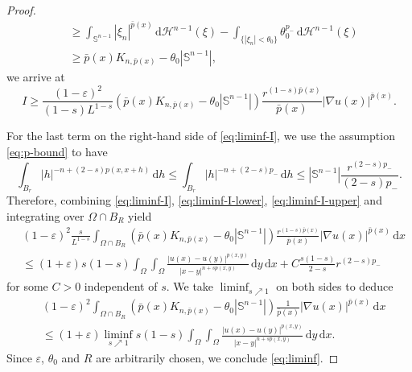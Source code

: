 \documentclass[10pt,a4paper]{amsart}
\begin{document}
\begin{proof}
\begin{equation*}
\begin{split}
&\geq \int_{\mathbb{S}^{n-1}} |\xi_{n}|^{\bar{p}(x)} \,\mathrm{d}\mathcal{H}^{n-1}(\xi) - \int_{\lbrace |\xi_{n}| < \theta_{0} \rbrace} \theta_{0}^{p_{-}} \,\mathrm{d}\mathcal{H}^{n-1}(\xi) \\
&\geq \bar{p}(x) K_{n, \bar{p}(x)} - \theta_{0} |\mathbb{S}^{n-1}|,
\end{split}
\end{equation*}
we arrive at
\begin{equation} \label{eq:liminf-I-lower}
I \geq \frac{(1-\varepsilon)^2}{(1-s)L^{1-s}} \left( \bar{p}(x) K_{n, \bar{p}(x)} - \theta_0 |\mathbb{S}^{n-1}| \right) \frac{r^{(1-s)\bar{p}(x)}}{\bar{p}(x)} |\nabla u(x)|^{\bar{p}(x)}.
\end{equation}

For the last term on the right-hand side of \eqref{eq:liminf-I}, we use the assumption \eqref{eq:p-bound} to have
\begin{equation} \label{eq:liminf-I-upper}
\int_{B_{r}} |h|^{-n+(2-s)p(x, x+h)} \,\mathrm{d}h \leq \int_{B_{r}} |h|^{-n+(2-s)p_{-}} \,\mathrm{d}h \leq |\mathbb{S}^{n-1}| \frac{r^{(2-s)p_{-}}}{(2-s)p_{-}}.
\end{equation}
Therefore, combining \eqref{eq:liminf-I}, \eqref{eq:liminf-I-lower}, \eqref{eq:liminf-I-upper} and integrating over $\Omega \cap B_{R}$ yield
\begin{equation*}
\begin{split}
&(1-\varepsilon)^{2} \frac{s}{L^{1-s}} \int_{\Omega \cap B_{R}} \left( \bar{p}(x) K_{n, \bar{p}(x)} - \theta_{0} |\mathbb{S}^{n-1}| \right) \frac{r^{(1-s)\bar{p}(x)}}{\bar{p}(x)} |\nabla u(x)|^{\bar{p}(x)} \,\mathrm{d}x \\
&\leq (1+\varepsilon) s(1-s) \int_{\Omega} \int_{\Omega} \frac{|u(x)-u(y)|^{p(x, y)}}{|x-y|^{n+sp(x, y)}} \,\mathrm{d}y \,\mathrm{d}x + C \frac{s(1-s)}{2-s} r^{(2-s)p_{-}}
\end{split}
\end{equation*}
for some $C > 0$ independent of $s$. We take $\liminf_{s \nearrow 1}$ on both sides to deduce
\begin{equation*}
\begin{split}
&(1-\varepsilon)^{2} \int_{\Omega \cap B_{R}} \left( \bar{p}(x) K_{n, \bar{p}(x)} - \theta_{0} |\mathbb{S}^{n-1}| \right) \frac{1}{\bar{p}(x)} |\nabla u(x)|^{\bar{p}(x)} \,\mathrm{d}x \\
&\leq (1+\varepsilon) \liminf_{s \nearrow 1} s(1-s) \int_{\Omega} \int_{\Omega} \frac{|u(x)-u(y)|^{p(x, y)}}{|x-y|^{n+sp(x, y)}} \,\mathrm{d}y \,\mathrm{d}x.
\end{split}
\end{equation*}
Since $\varepsilon$, $\theta_0$ and $R$ are arbitrarily chosen, we conclude \eqref{eq:liminf}.
\end{proof}
\end{document}
